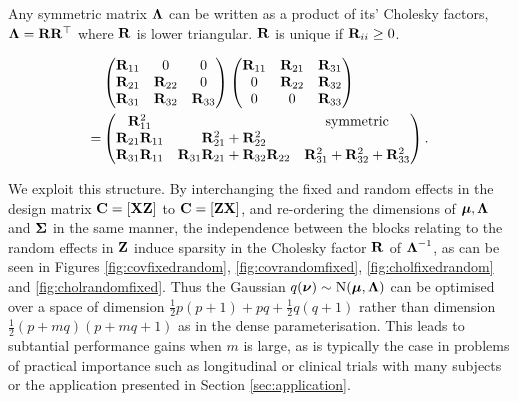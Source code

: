 	Any symmetric matrix ${\boldsymbol \Lambda}$ can be written as a product of its' Cholesky factors, ${\boldsymbol \Lambda} =
	{\bf R} {\bf R}^\top$ where ${\bf R}$ is lower triangular. ${\bf R}$ is unique if ${\bf R}_{ii} \geq 0$.
		
	\begin{align*}
		&\begin{pmatrix}
		{\bf R}_{11}          & 0                                    & 0                                     \\
		{\bf R}_{21}          & {\bf R}_{22}                             & 0                                     \\
		{\bf R}_{31}          & {\bf R}_{32}                             & {\bf R}_{33}                              
		\end{pmatrix}
		\begin{pmatrix}
		{\bf R}_{11}          & {\bf R}_{21}                             & {\bf R}_{31}                              \\
		0                 & {\bf R}_{22}                             & {\bf R}_{32}                              \\
		0                 & 0                                    & {\bf R}_{33}                              
		\end{pmatrix}
		\\
		=& \begin{pmatrix}
		{\bf R}_{11}^2        &                                      & \text{symmetric}                      \\
		{\bf R}_{21}{\bf R}_{11} & {\bf R}_{21}^2 + {\bf R}_{22}^2 \\
		{\bf R}_{31} {\bf R}_{11} & {\bf R}_{31}{\bf R}_{21} + {\bf R}_{32} {\bf R}_{22} & {\bf R}_{31}^2 + {\bf R}_{32} ^2 + {\bf R}_{33}^2 
		\end{pmatrix}.
	\end{align*}
	
	\noindent We exploit this structure. By interchanging the fixed and random effects in the design matrix ${\bf C} = [{\bf X} {\bf Z}]$ to ${\bf C} = [{\bf Z} {\bf X}]$, and re-ordering the dimensions of ${\boldsymbol \mu}, {\boldsymbol \Lambda}$ and ${\boldsymbol \Sigma}$ in the same manner, the independence between the
	blocks relating to the random effects in ${\bf Z}$ induce sparsity in the Cholesky factor ${\bf R}$ of
	${\boldsymbol \Lambda}^{-1}$, as can be seen in Figures \ref{fig:covfixedrandom}, \ref{fig:covrandomfixed},
	\ref{fig:cholfixedrandom} and \ref{fig:cholrandomfixed}. Thus the Gaussian $q({\boldsymbol \nu}) \sim \text{N}({\boldsymbol \mu}, {\boldsymbol \Lambda})$ can be optimised over a space of dimension $\frac{1}{2} p (p + 1) + pq + \frac{1}{2} q (q + 1)$ rather than dimension
	$\frac{1}{2} (p + mq) (p + mq + 1)$ as in the dense parameterisation. This leads to subtantial performance gains
	when $m$ is large, as is typically the case in problems of practical importance such as longitudinal or 
	clinical trials with many subjects or the application presented in Section \ref{sec:application}.
			
